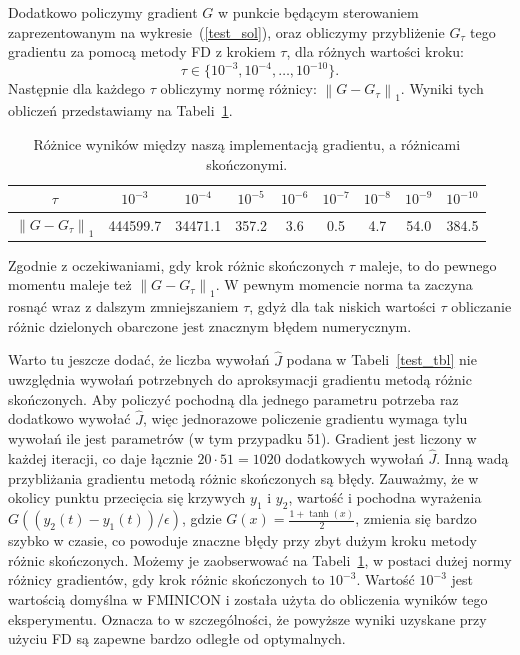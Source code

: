 \documentclass[licencjacka]{pracamgr}
\newcommand{\norm}[1]{\left\lVert#1\right\rVert}
\begin{document}
Dodatkowo policzymy gradient $G$ w punkcie będącym sterowaniem zaprezentowanym na wykresie~(\ref{test_sol}), oraz obliczymy przybliżenie $G_\tau$ tego gradientu za pomocą metody FD z krokiem $\tau$, dla różnych wartości kroku:
\[\tau \in \{10^{-3},10^{-4},\ldots,10^{-10}\}.\]
Następnie dla każdego $\tau$ obliczymy normę różnicy: $\norm{G - G_\tau}_1$. Wyniki tych obliczeń przedstawiamy na Tabeli~\ref{grad_fd_tbl}.

\begin{table}[h!]
  \begin{center}
    \begin{tabular}{|c|c|c|c|c|c|c|c|c|}
      \hline
      $\tau$ & $10^{-3}$ & $10^{-4}$ & $10^{-5}$ & $10^{-6}$ & $10^{-7}$ & $10^{-8}$ & $10^{-9}$ & $10^{-10}$ \\
      \hline
      $\norm{G - G_\tau}_1$ & 444599.7 & 34471.1 & 357.2 & 3.6 & 0.5 & 4.7 & 54.0 & 384.5 \\
      \hline
    \end{tabular}
    \caption{Różnice wyników między naszą implementacją gradientu, a różnicami skończonymi.}\label{grad_fd_tbl}
  \end{center}
\end{table}

Zgodnie z oczekiwaniami, gdy krok różnic skończonych $\tau$ maleje, to do pewnego momentu maleje też $\norm{G - G_\tau}_1$. W pewnym momencie norma ta zaczyna rosnąć wraz z dalszym zmniejszaniem $\tau$, gdyż dla tak niskich wartości $\tau$ obliczanie różnic dzielonych obarczone jest znacznym błędem numerycznym.

Warto tu jeszcze dodać, że liczba wywołań $\hat{J}$ podana w Tabeli~\ref{test_tbl} nie uwzględnia wywołań potrzebnych do aproksymacji gradientu metodą różnic skończonych. Aby policzyć pochodną dla jednego parametru potrzeba raz dodatkowo wywołać $\hat{J}$, więc jednorazowe policzenie gradientu wymaga tylu wywołań ile jest parametrów (w tym przypadku 51). Gradient jest liczony w każdej iteracji, co daje łącznie $20\cdot 51 = 1020$ dodatkowych wywołań $\hat{J}$. Inną wadą przybliżania gradientu metodą różnic skończonych są błędy. Zauważmy, że w okolicy punktu przecięcia się krzywych $y_1$ i $y_2$, wartość i pochodna wyrażenia $G((y_2(t) - y_1(t))/\epsilon)$, gdzie $G(x) = \frac{1 + \tanh(x)}{2}$, zmienia się bardzo szybko w czasie, co powoduje znaczne błędy przy zbyt dużym kroku metody różnic skończonych. Możemy je zaobserwować na Tabeli~\ref{grad_fd_tbl}, w postaci dużej normy różnicy gradientów, gdy krok różnic skończonych to $10^{-3}$. Wartość $10^{-3}$ jest wartością domyślna w FMINICON i została użyta do obliczenia wyników tego eksperymentu. Oznacza to w szczególności, że powyższe wyniki uzyskane przy użyciu FD są zapewne bardzo odległe od optymalnych.
\end{document}
